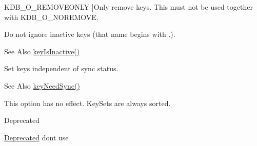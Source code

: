\begin{Desc}
\begin{description}
{\hypertarget{group__kdb_gga98a3d6a4016c9dad9cbd1a99a9c2a45aaf6ed09cee8aa8cf0d6a0e318a7105440}{K\-D\-B\-\_\-\-O\-\_\-\-R\-E\-M\-O\-V\-E\-O\-N\-L\-Y}\label{group__kdb_gga98a3d6a4016c9dad9cbd1a99a9c2a45aaf6ed09cee8aa8cf0d6a0e318a7105440}
}]Only remove keys. This must not be used together with K\-D\-B\-\_\-\-O\-\_\-\-N\-O\-R\-E\-M\-O\-V\-E. \item[{\em 
\hypertarget{group__kdb_gga98a3d6a4016c9dad9cbd1a99a9c2a45aa789926d8a8e15b029cf7dded4154bcda}{K\-D\-B\-\_\-\-O\-\_\-\-I\-N\-A\-C\-T\-I\-V\-E}\label{group__kdb_gga98a3d6a4016c9dad9cbd1a99a9c2a45aa789926d8a8e15b029cf7dded4154bcda}
}]Do not ignore inactive keys (that name begins with .). \begin{DoxySeeAlso}{See Also}
\hyperlink{group__keytest_gaa25f699f592031c1a0abc1504d14e13e}{key\-Is\-Inactive()} 
\end{DoxySeeAlso}
\item[{\em 
\hypertarget{group__kdb_gga98a3d6a4016c9dad9cbd1a99a9c2a45aaa7d5265eacbb1590982b718f35443e2e}{K\-D\-B\-\_\-\-O\-\_\-\-S\-Y\-N\-C}\label{group__kdb_gga98a3d6a4016c9dad9cbd1a99a9c2a45aaa7d5265eacbb1590982b718f35443e2e}
}]Set keys independent of sync status. \begin{DoxySeeAlso}{See Also}
\hyperlink{group__keytest_gaf247df0de7aca04b32ef80e39ef12950}{key\-Need\-Sync()} 
\end{DoxySeeAlso}
\item[{\em 
\hypertarget{group__kdb_gga98a3d6a4016c9dad9cbd1a99a9c2a45aad9d03b36ee88ca5a774cc01b190c99b8}{K\-D\-B\-\_\-\-O\-\_\-\-S\-O\-R\-T}\label{group__kdb_gga98a3d6a4016c9dad9cbd1a99a9c2a45aad9d03b36ee88ca5a774cc01b190c99b8}
}]This option has no effect. Key\-Sets are always sorted. \begin{DoxyRefDesc}{Deprecated}
\item[\hyperlink{deprecated__deprecated000001}{Deprecated}]dont use \end{DoxyRefDesc}

\end{description}
\end{Desc}
